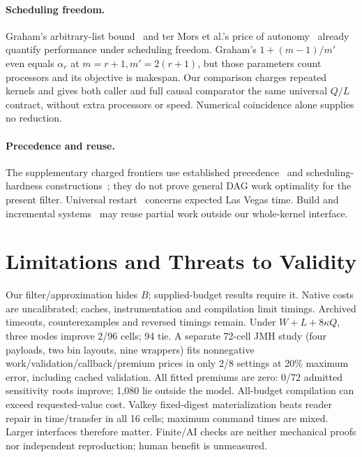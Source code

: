 \documentclass[acmsmall,screen,review,anonymous]{acmart}
\begin{document}
\paragraph{Scheduling freedom.}
Graham's arbitrary-list bound~\cite[Theorem~1]{graham1969} and ter Mors et al.'s price of autonomy~\cite[Theorem~1, Proposition~4]{termors2010} already quantify performance under scheduling freedom. Graham's $1+(m-1)/m'$ even equals $\alpha_r$ at $m=r+1,m'=2(r+1)$, but those parameters count processors and its objective is makespan. Our comparison charges repeated kernels and gives both caller and full causal comparator the same universal $Q/L$ contract, without extra processors or speed. Numerical coincidence alone supplies no reduction.

\paragraph{Precedence and reuse.}
The supplementary charged frontiers use established precedence~\cite{lawler1973} and scheduling-hardness constructions~\cite{gareyjohnson1976}; they do not prove general DAG work optimality for the present filter. Universal restart~\cite{luby1993} concerns expected Las Vegas time. Build and incremental systems~\cite{mokhov2018,leywild2009,adapton2014} may reuse partial work outside our whole-kernel interface.

\section{Limitations and Threats to Validity}
\label{sec:limits}

Our filter/approximation hides $B$; supplied-budget results require it. Native costs are uncalibrated; caches, instrumentation and compilation limit timings. Archived timeouts, counterexamples and reversed timings remain. Under $W+L+8\kappa Q$, three modes improve 2/96 cells; 94 tie. A separate 72-cell JMH study (four payloads, two bin layouts, nine wrappers) fits nonnegative work/validation/callback/premium prices in only 2/8 settings at 20\% maximum error, including cached validation. All fitted premiums are zero: 0/72 admitted sensitivity roots improve; 1,080 lie outside the model. All-budget compilation can exceed requested-value cost. Valkey fixed-digest materialization beats reader repair in time/transfer in all 16 cells; maximum command times are mixed. Larger interfaces therefore matter. Finite/AI checks are neither mechanical proofs nor independent reproduction; human benefit is unmeasured.
\end{document}
